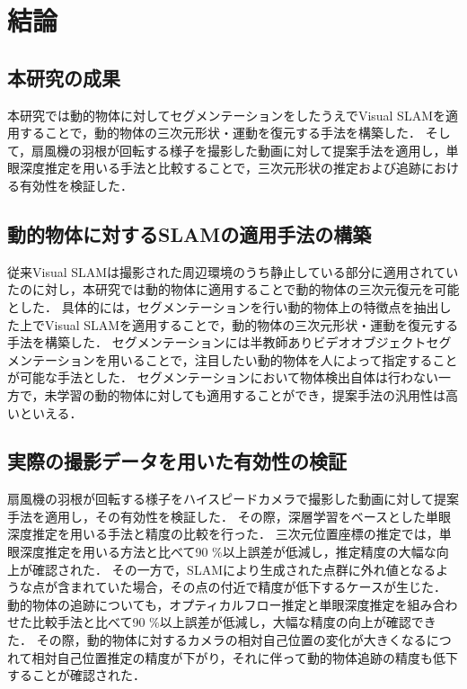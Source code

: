 \section{結論}\label{sec:conclusion}
\subsection{本研究の成果}\label{subsec:result}
本研究では動的物体に対してセグメンテーションをしたうえでVisual SLAMを適用することで，動的物体の三次元形状・運動を復元する手法を構築した．
そして，扇風機の羽根が回転する様子を撮影した動画に対して提案手法を適用し，単眼深度推定を用いる手法と比較することで，三次元形状の推定および追跡における有効性を検証した．
\begin{comment}
	\vskip.5\baselineskip
	\scalebox{1.2}{\textbf{動的物体に対するSLAMの適用手法の構築}}
\end{comment}
\subsection*{動的物体に対するSLAMの適用手法の構築}

従来Visual SLAMは撮影された周辺環境のうち静止している部分に適用されていたのに対し，本研究では動的物体に適用することで動的物体の三次元復元を可能とした．
具体的には，セグメンテーションを行い動的物体上の特徴点を抽出した上でVisual SLAMを適用することで，動的物体の三次元形状・運動を復元する手法を構築した．
セグメンテーションには半教師ありビデオオブジェクトセグメンテーションを用いることで，注目したい動的物体を人によって指定することが可能な手法とした．
セグメンテーションにおいて物体検出自体は行わない一方で，未学習の動的物体に対しても適用することができ，提案手法の汎用性は高いといえる．

\subsection*{実際の撮影データを用いた有効性の検証}

扇風機の羽根が回転する様子をハイスピードカメラで撮影した動画に対して提案手法を適用し，その有効性を検証した．
その際，深層学習をベースとした単眼深度推定を用いる手法と精度の比較を行った．
三次元位置座標の推定では，単眼深度推定を用いる方法と比べて90 \%以上誤差が低減し，推定精度の大幅な向上が確認された．
その一方で，SLAMにより生成された点群に外れ値となるような点が含まれていた場合，その点の付近で精度が低下するケースが生じた．
動的物体の追跡についても，オプティカルフロー推定と単眼深度推定を組み合わせた比較手法と比べて90 \%以上誤差が低減し，大幅な精度の向上が確認できた．
その際，動的物体に対するカメラの相対自己位置の変化が大きくなるにつれて相対自己位置推定の精度が下がり，それに伴って動的物体追跡の精度も低下することが確認された．

